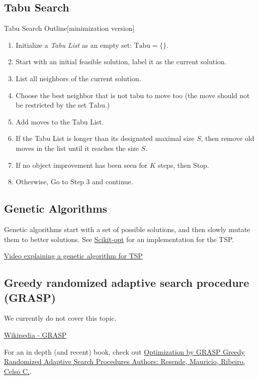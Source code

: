 \subsection{Tabu Search}
\begin{general}{Tabu Search Outline}{[minimization version]}
\begin{enumerate}
\item Initialize a \emph{Tabu List} as an empty set: $\textrm{Tabu} = \{ \}$.
\item Start with an initial feasible solution, label it as the current solution.
\item List all neighbors of the current solution.
\item Choose the best neighbor that is not tabu to move too (the move should not be restricted by the set $\textrm{Tabu}$.)
\item Add moves to the Tabu List.
\item If the Tabu List is longer than its designated maximal size $S$, then remove old moves in the list until it reaches the size $S$.
\item If no object improvement has been seen for $K$ steps, then Stop.
\item Otherwise, Go to Step 3 and continue.
\end{enumerate}
\end{general}


\subsection{Genetic Algorithms}
Genetic algorithms start with a set of possible solutions, and then slowly mutate them to better solutions.  See \href{https://github.com/guofei9987/scikit-opt}{Scikit-opt} for an implementation for the TSP.


\href{https://www.youtube.com/watch?v=XP8R0yzAbdo&ab_channel=FullstackAcademy}{Video explaining a genetic algorithm for TSP}

\subsection{Greedy randomized adaptive search procedure (GRASP)}
We currently do not cover this topic.  

\href{https://en.wikipedia.org/wiki/Greedy_randomized_adaptive_search_procedure}{Wikipedia - GRASP}

For an in depth (and recent) book, check out
\href{https://www.springer.com/gp/book/9781493965281}{Optimization by GRASP
Greedy Randomized Adaptive Search Procedures
Authors: Resende, Mauricio, Ribeiro, Celso C.}.

